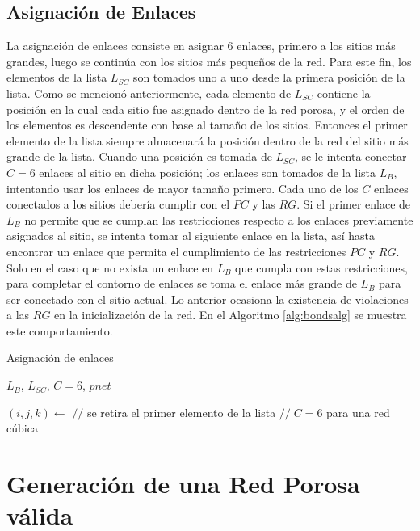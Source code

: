 \subsection{Asignación de Enlaces}
\label{subsec:sbonds}
La asignación de enlaces consiste en asignar 6 enlaces, primero a los sitios más grandes, luego se continúa con los sitios más pequeños de 
la red. Para este fin, los elementos de la lista $L_{SC}$ son tomados uno a uno desde la primera posición de la lista. Como se mencionó 
anteriormente, cada elemento de $L_{SC}$ contiene la posición en la cual cada sitio fue asignado dentro de la red porosa, y el orden de 
los elementos es descendente con base al tamaño de los sitios. Entonces el primer elemento de la lista siempre almacenará la posición 
dentro de la red del sitio más grande de la lista. Cuando una posición es tomada de $L_{SC}$, se le intenta conectar $C=6$ enlaces 
al sitio en dicha posición; los enlaces son tomados de la lista $L_B$, intentando usar los enlaces de mayor tamaño primero. Cada uno 
de los $C$ enlaces conectados a los sitios debería cumplir con el $PC$ y las $RG$. Si el primer enlace de $L_B$ no permite que se cumplan
las restricciones respecto a los enlaces previamente asignados al sitio, se intenta tomar al siguiente enlace en la lista, así hasta encontrar
un enlace que permita el cumplimiento de las restricciones $PC$ y $RG$. Solo en el caso que no exista un enlace en $L_B$ que 
cumpla con estas restricciones, para completar el contorno de enlaces se toma el enlace más grande de $L_B$ para ser conectado con 
el sitio actual. Lo anterior ocasiona la existencia de violaciones a las $RG$ en la inicialización de la red. En el Algoritmo \ref{alg:bondsalg} se muestra 
este comportamiento.\\

\begin{algorithm}
\caption{Asignación de enlaces}\label{alg:bondsalg}
\begin{algorithmic}[1]
\Require $L_B$, $L_{SC}$, $C=6$, $pnet$

	\State $(i,j,k)\gets $ {$//$ se retira el primer elemento de la lista}
	 {$//\;C=6$ para una red cúbica}
		\State {}
	\EndFor
\EndWhile
\end{algorithmic}
\end{algorithm}

\section{Generación de una Red Porosa válida}
\label{sec:svalid}


